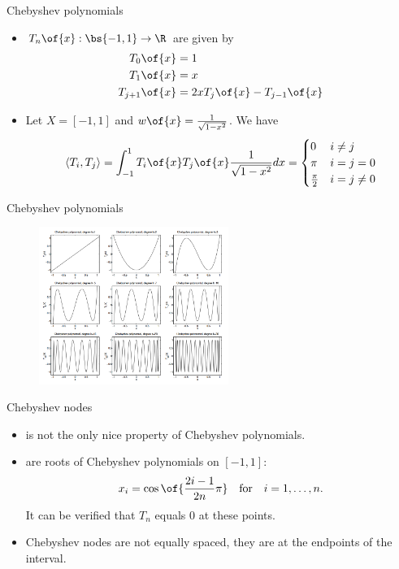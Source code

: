 \documentclass[11pt,xcolor={dvipsnames},aspectratio=159,hyperref={pdftex,pdfpagemode=UseNone,hidelinks,pdfdisplaydoctitle=true},usepdftitle=false]{beamer}
\begin{document}
\begin{frame}{Chebyshev polynomials}
    \begin{itemize}

        \item {} $T_n\of{x}: \bs{-1,1} \rightarrow \R$ are given by \begin{align*}
        T_0\of{x} &= 1 \\
        T_1\of{x} &= x \\
        T_{j+1}\of{x} &= 2xT_j\of{x} - T_{j-1}\of{x}
        \end{align*}
        \item Let $X = [-1,1]$ and $w\of{x} = \frac{1}{\sqrt{1-x^2}}$. We have 
        \begin{align*}
            \langle T_i, T_j \rangle = \int_{-1}^{1} T_i\of{x} T_j\of{x} \frac{1}{\sqrt{1-x^2}} dx = \begin{cases}
                0 & i\neq j \\
                \pi & i = j = 0 \\
                \frac{\pi}{2} & i = j \neq 0
            \end{cases}
        \end{align*}
    \end{itemize}
\end{frame}

\begin{frame}{Chebyshev polynomials}
    \centering
    \begin{figure}
        \includegraphics[width=0.55\textwidth]{chebyshev.png}
    \end{figure}
    \end{frame}

\begin{frame}{Chebyshev nodes}
    \begin{itemize}
        \item {} is not the only nice property of Chebyshev polynomials.
        \item {} are roots of Chebyshev polynomials on $[-1,1]$: 
        \begin{align*}
        x_i = \cos\of{\frac{2i-1}{2n}\pi} \quad \text{for} \quad i = 1,\ldots,n.
        \end{align*}
        It can be verified that $T_n$ equals 0 at these points.
        \item Chebyshev nodes are not equally spaced, they are  at the endpoints of the interval.
    \end{itemize}
\end{frame}
\end{document}
